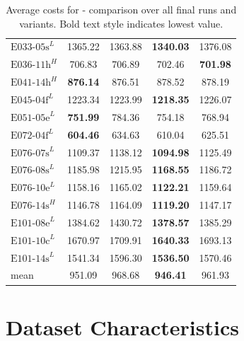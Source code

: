 \begin{table}
\begin{tabular}{lcccc}
		$\text{E033-05s}^L$ & 1365.22                     & 1363.88         & \textbf{1340.03} & 1376.08         \\
		$\text{E036-11h}^H$ & 706.83                      & 706.89          & 702.46           & \textbf{701.98} \\
		$\text{E041-14h}^H$ & \textbf{876.14}             & 876.51          & 878.52           & 878.19          \\
		$\text{E045-04f}^L$ & 1223.34                     & 1223.99         & \textbf{1218.35} & 1226.07         \\
		$\text{E051-05e}^L$ & \textbf{751.99}             & 784.36          & 754.18           & 768.94          \\
		$\text{E072-04f}^L$ & \textbf{604.46}             & 634.63          & 610.04           & 625.51          \\
		$\text{E076-07s}^L$ & 1109.37                     & 1138.12         & \textbf{1094.98} & 1125.49         \\
		$\text{E076-08s}^L$ & 1185.98                     & 1215.95         & \textbf{1168.55} & 1186.72         \\
		$\text{E076-10e}^L$ & 1158.16                     & 1165.02         & \textbf{1122.21} & 1159.64         \\
		$\text{E076-14s}^H$ & 1146.78                     & 1164.09         & \textbf{1119.20} & 1147.17         \\
		$\text{E101-08e}^L$ & 1384.62                     & 1430.72         & \textbf{1378.57} & 1385.29         \\
		$\text{E101-10c}^L$ & 1670.97                     & 1709.91         & \textbf{1640.33} & 1693.13         \\
		$\text{E101-14s}^L$ & 1541.34                     & 1596.30         & \textbf{1536.50} & 1570.46         \\\midrule
		mean                & 951.09                      & 968.68          & \textbf{946.41}  & 961.93          \\
		\bottomrule
	\end{tabular}
	\caption[Average costs for \gendreauDataSetText - comparison over all final runs and variants.]
	{Average costs for \gendreauDataSetText - comparison over all final runs and variants. Bold text style indicates lowest value.}
	\label{tab:final_mean_comparison}
\end{table}
\clearpage

\section{Dataset Characteristics}
\label{sec:visualization}

